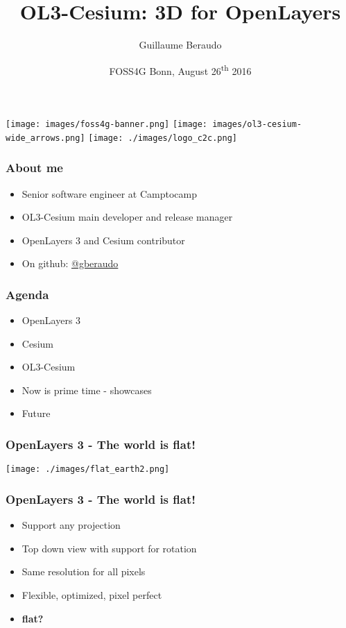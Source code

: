 \documentclass[handout]{beamer}
\title{OL3-Cesium: 3D for OpenLayers}
\author{Guillaume Beraudo}
\date{FOSS4G Bonn, August 26\textsuperscript{th} 2016}
\begin{document}
  \begin{frame}
    \titlepage
    \begin{center}
      \texttt{[image: images/foss4g-banner.png]}
      \texttt{[image: images/ol3-cesium-wide\_arrows.png]}
      \texttt{[image: ./images/logo\_c2c.png]}
    \end{center}
  \end{frame}


  \begin{frame}
    \frametitle{About me}
    \begin{itemize}
      \item Senior software engineer at Camptocamp
      \item OL3-Cesium main developer and release manager
      \item OpenLayers 3 and Cesium contributor
      \item On github: \href {https://github.com/gberaudo}{@gberaudo}
      \end{itemize}
  \end{frame}


  \begin{frame}
    \frametitle{Agenda}
    \begin{itemize}
      \pause\item OpenLayers 3
      \pause\item Cesium
      \pause\item OL3-Cesium
      \pause\item Now is prime time - showcases
      \pause\item Future
      \end{itemize}
  \end{frame}


  \begin{frame}
    \frametitle{OpenLayers 3 - The world is flat!}
    \begin{center}
     \texttt{[image: ./images/flat\_earth2.png]}
    \end{center}
  \end{frame}


  \begin{frame}
    \frametitle{OpenLayers 3 - The world is flat!}
    \begin{itemize}
      \pause\item Support any projection
      \pause\item Top down view with support for rotation
      \pause\item Same resolution for all pixels
      \pause\item Flexible, optimized, pixel perfect
      \pause\item \textbf{flat?}
     \end{itemize}
  \end{frame}
\end{document}
